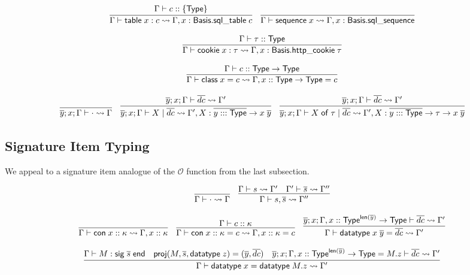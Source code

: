 \documentclass{article}
\newcommand{\mt}[1]{\mathsf{#1}}
\begin{document}
$$\infer{\Gamma \vdash \mt{table} \; x : c \leadsto \Gamma, x : \mt{Basis}.\mt{sql\_table} \; c}{
  \Gamma \vdash c :: \{\mt{Type}\}
}
\quad \infer{\Gamma \vdash \mt{sequence} \; x \leadsto \Gamma, x : \mt{Basis}.\mt{sql\_sequence}}{}$$

$$\infer{\Gamma \vdash \mt{cookie} \; x : \tau \leadsto \Gamma, x : \mt{Basis}.\mt{http\_cookie} \; \tau}{
  \Gamma \vdash \tau :: \mt{Type}
}$$

$$\infer{\Gamma \vdash \mt{class} \; x = c \leadsto \Gamma, x :: \mt{Type} \to \mt{Type} = c}{
  \Gamma \vdash c :: \mt{Type} \to \mt{Type}
}$$

$$\infer{\overline{y}; x; \Gamma \vdash \cdot \leadsto \Gamma}{}
\quad \infer{\overline{y}; x; \Gamma \vdash X \mid \overline{dc} \leadsto \Gamma', X : \overline{y ::: \mt{Type}} \to x \; \overline{y}}{
  \overline{y}; x; \Gamma \vdash \overline{dc} \leadsto \Gamma'
}
\quad \infer{\overline{y}; x; \Gamma \vdash X \; \mt{of} \; \tau \mid \overline{dc} \leadsto \Gamma', X : \overline{y ::: \mt{Type}} \to \tau \to x \; \overline{y}}{
  \overline{y}; x; \Gamma \vdash \overline{dc} \leadsto \Gamma'
}$$

\subsection{Signature Item Typing}

We appeal to a signature item analogue of the $\mathcal O$ function from the last subsection.

$$\infer{\Gamma \vdash \cdot \leadsto \Gamma}{}
\quad \infer{\Gamma \vdash s, \overline{s} \leadsto \Gamma''}{
  \Gamma \vdash s \leadsto \Gamma'
  & \Gamma' \vdash \overline{s} \leadsto \Gamma''
}$$

$$\infer{\Gamma \vdash \mt{con} \; x :: \kappa \leadsto \Gamma, x :: \kappa}{}
\quad \infer{\Gamma \vdash \mt{con} \; x :: \kappa = c \leadsto \Gamma, x :: \kappa = c}{
  \Gamma \vdash c :: \kappa
}
\quad \infer{\Gamma \vdash \mt{datatype} \; x \; \overline{y} = \overline{dc} \leadsto \Gamma'}{
  \overline{y}; x; \Gamma, x :: \mt{Type}^{\mt{len}(\overline y)} \to \mt{Type} \vdash \overline{dc} \leadsto \Gamma'
}$$

$$\infer{\Gamma \vdash \mt{datatype} \; x = \mt{datatype} \; M.z \leadsto \Gamma'}{
  \Gamma \vdash M : \mt{sig} \; \overline{s} \; \mt{end}
  & \mt{proj}(M, \overline{s}, \mt{datatype} \; z) = (\overline{y}, \overline{dc})
  & \overline{y}; x; \Gamma, x :: \mt{Type}^{\mt{len}(\overline y)} \to \mt{Type} = M.z \vdash \overline{dc} \leadsto \Gamma'
}$$
\end{document}
